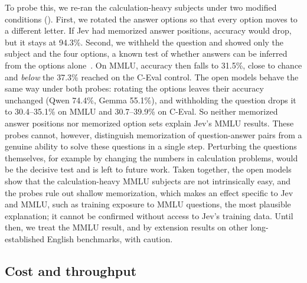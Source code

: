 \documentclass[table]{article}
\begin{document}
To probe this, we re-ran the calculation-heavy subjects under two modified conditions (). First, we rotated the answer options so that every option moves to a different letter. If Jev had memorized answer positions, accuracy would drop, but it stays at 94.3\%. Second, we withheld the question and showed only the subject and the four options, a known test of whether answers can be inferred from the options alone~\cite{balepur-etal-2024-artifacts}. On MMLU, accuracy then falls to 31.5\%, close to chance and \emph{below} the 37.3\% reached on the C-Eval control. The open models behave the same way under both probes: rotating the options leaves their accuracy unchanged (Qwen 74.4\%, Gemma 55.1\%), and withholding the question drops it to 30.4--35.1\% on MMLU and 30.7--39.9\% on C-Eval. So neither memorized answer positions nor memorized option sets explain Jev's MMLU results. 
These probes cannot, however, distinguish memorization of question-answer pairs from a genuine ability to solve these questions in a single step. Perturbing the questions themselves, for example by changing the numbers in calculation problems, would be the decisive test and is left to future work. Taken together, the open models show that the calculation-heavy MMLU subjects are not intrinsically easy, and the probes rule out shallow memorization, which makes an effect specific to Jev and MMLU, such as training exposure to MMLU questions, the most plausible explanation; it cannot be confirmed without access to Jev's training data. Until then, we treat the MMLU result, and by extension results on other long-established English benchmarks, with caution.

\subsection{Cost and throughput}

\begin{table}[t]
\centering
\caption{Requests, input tokens, cost and mean client-side latency per request (at 32 concurrent requests) for the evaluation run, by category. Requests counts unique requests sent during the evaluation run. Identical items (1,911 duplicates across 17 datasets) are sent once and scored for every occurrence; 4 items had already been answered in the development pilot and 1 over-long BIG-bench item was rejected.}
\label{tab:cost}
\footnotesize
\setlength{\tabcolsep}{4pt}

\end{table}
\end{document}
